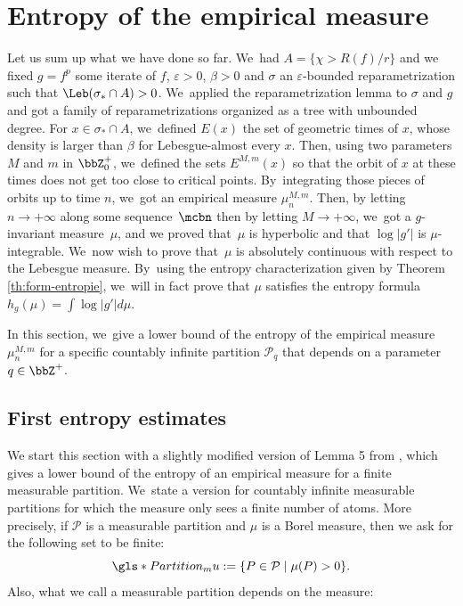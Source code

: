 \section{Entropy of the empirical measure}
\label{sec:entropie}

Let us sum up what we have done so far. We~had $A = \{ \chi > R(f) / r \}$ and we fixed $g = f^p$ some iterate of $f$, $\varepsilon > 0$, $\beta > 0$ and $\sigma$ an $\varepsilon$-bounded reparametrization such that $\Leb(\sigma_* \cap A) > 0$. We~applied the reparametrization lemma to $\sigma$ and $g$ and got a family of reparametrizations organized as a tree with unbounded degree.
For $x \in \sigma_* \cap A$, we~defined $E(x)$ the set of geometric times of $x$, whose density is larger than $\beta$ for Lebesgue-almost every $x$.
Then, using two parameters $M$ and $m$ in $\bbZ_0^+$, we~defined the sets $E^{M,m}(x)$ so that the orbit of $x$ at these times does not get too close to critical points. By~integrating those pieces of orbits up to time $n$, we~got an empirical measure $\mu_n^{M,m}$.
Then, by letting $n \to +\infty$ along some sequence~$\mcbn$ then by letting $M \to +\infty$, we~got a $g$-invariant measure~$\mu$, and we proved that~$\mu$ is hyperbolic and that $\log |g'|$ is $\mu$-integrable. We~now wish to prove that~$\mu$ is absolutely continuous with respect to the Lebesgue measure. By~using the entropy characterization given by Theorem \ref{th:form-entropie}, we~will in fact prove that $\mu$ satisfies the entropy formula $h_g(\mu) = \int \log |g'| d \mu$.

In this section, we~give a lower bound of the entropy of the empirical measure $\mu_n^{M,m}$ for a specific countably infinite partition $\mathcal{P}_q$ that depends on a parameter $q \in \bbZ^+$.

\subsection{First entropy estimates}
\label{ssec:entropie1}

We start this section with a slightly modified version of Lemma 5 from \cite{MR4701884}, which gives a lower bound of the entropy of an empirical measure for a finite measurable partition. We~state a version for countably infinite measurable partitions for which the measure only sees a finite number of atoms. More precisely, if $\mathcal{P}$ is a measurable partition and $\mu$ is a Borel measure, then we ask for the following set to be finite:
\[
\gls*{Partition_mu} := \{ P \in \mathcal{P} \mid \mu(P) > 0 \}.
\]
Also, what we call a measurable partition depends on the measure:

